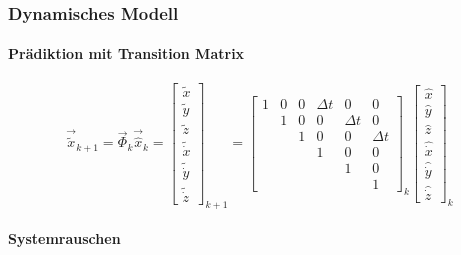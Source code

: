 \subsubsection{Dynamisches Modell}

\paragraph{Prädiktion mit Transition Matrix}

\begin{equation}
	\vec{\tilde x}_{k+1}  =  \vec{\Phi}_k \vec{\hat x}_k = 
		\begin{bmatrix}
 			\tilde{x}\\\tilde{y}\\\tilde{z}\\\tilde{\dot{x}}\\\tilde{\dot{y}}\\\tilde{\dot{z}}
		\end{bmatrix}_{k+1} = 
		\begin{bmatrix}
			1&0&0&\Delta t&0&0\\
			&1&0&0&\Delta t&0\\
			&&1&0&0&\Delta t\\
			&&&1&0&0\\
			&&&&1&0\\
			&&&&&1
		\end{bmatrix}_k
		\begin{bmatrix}
 			\hat{x}\\\hat{y}\\\hat{z}\\\hat{\dot{x}}\\\hat{\dot{y}}\\\hat{\dot{z}}
		\end{bmatrix}_k
\end{equation}

\paragraph{Systemrauschen}

